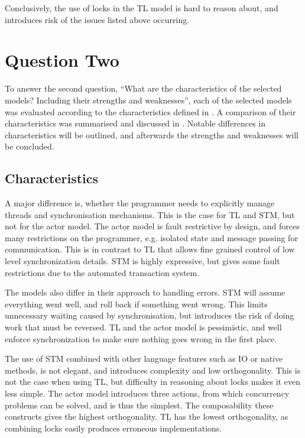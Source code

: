 Conclusively, the use of locks in the \ac{TL} model is hard to reason about, and introduces risk of the issues listed above occurring. 

\section{Question Two}
To answer the second question, ``What are the characteristics of the selected models? Including their strengths and weaknesses'', each of the selected models was evaluated according to the characteristics defined in . A comparison of their characteristics was summarised and discussed in . Notable differences in characteristics will be outlined, and afterwards the strengths and weaknesses will be concluded.

\subsection{Characteristics}
A major difference is, whether the programmer needs to explicitly manage threads and synchronisation mechanisms. This is the case for \ac{TL} and \ac{STM}, but not for the actor model. The actor model is fault restrictive by design, and forces many restrictions on the programmer, e.g. isolated state and message passing for communication. This is in contrast to \ac{TL} that allows fine grained control of low level synchronization details. \ac{STM} is highly expressive, but gives some fault restrictions due to the automated transaction system. 

The models also differ in their approach to handling errors. \ac{STM} will assume everything went well, and roll back if something went wrong. This limits unnecessary waiting caused by synchronisation, but introduces the risk of doing work that must be reversed. \ac{TL} and the actor model is pessimistic, and well enforce synchronization to make sure nothing goes wrong in the first place. 

The use of \ac{STM} combined with other language features such as \ac{IO} or native methods, is not elegant, and introduces complexity and low orthogonality. This is not the case when using \ac{TL}, but difficulty in reasoning about locks makes it even less simple. The actor model introduces three actions, from which concurrency problems can be solved, and is thus the simplest. The composability these constructs gives the highest orthogonality. \ac{TL} has the lowest orthogonality, as combining locks easily produces erroneous implementations.

